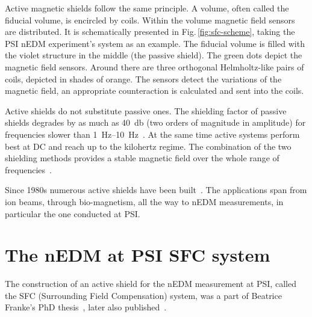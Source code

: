 Active magnetic shields follow the same principle. A volume, often called the fiducial volume, is encircled by coils. Within the volume magnetic field sensors are distributed. It is schematically presented in Fig.\,\ref{fig:sfc-scheme}, taking the PSI nEDM experiment's system as an example. The fiducial volume is filled with the violet structure in the middle (the passive shield). The green dots depict the magnetic field sensors. Around there are three orthogonal Helmholtz-like pairs of coils, depicted in shades of orange. The sensors detect the variations of the magnetic field, an appropriate counteraction is calculated and sent into the coils.

Active shields do not substitute passive ones. The shielding factor
 of passive shields degrades by as much as \SI{40}{\decibel} (two orders of magnitude in amplitude) for frequencies slower than \SIrange[range-phrase = --]{1}{10}{\hertz}~\cite{Brake1991}. At the same time active systems perform best at DC and reach up to the kilohertz regime. The combination of the two shielding methods provides a stable magnetic field over the whole range of frequencies~\cite{Brake1991,Kelha1982,Voigt2013}.

Since 1980s numerous active shields have been built~\cite{Kelha1982,Brake1991,Spemann2003,Brys2005,Kobayashi2012,Voigt2013,Afach2014}. The applications span from ion beams, through bio-magnetism, all the way to nEDM measurements, in particular the one conducted at PSI\@.




\section{The nEDM at PSI SFC system}
The construction of an active shield for the nEDM measurement at PSI, called the SFC (Surrounding Field Compensation) system,
was a part of Beatrice Franke's PhD thesis~\cite{Franke2013}, later also published~\cite{Afach2014}.

